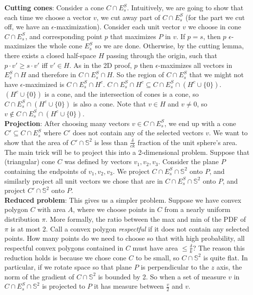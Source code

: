 \documentclass[12pt]{article}
\theoremstyle{definition}
\theoremstyle{lemma}
\theoremstyle{theorem}
\begin{document}
\textbf{Cutting cones}: Consider a cone $C \cap E^S_s$. Intuitively, we are going to show that each time we choose a vector $v$, we cut away part of $C \cap E^S_s$ (for the part we cut off, we have an $\epsilon$-maximization). Consider each unit vector $v$ we choose in cone $C \cap E^S_s$, and corresponding point $p$ that maximizes $P$ in $v$. If $p = s$, then $p$ $\epsilon$-maximizes the whole cone $E^S_s$ so we are done. Otherwise, by the cutting lemma, there exists a closed half-space $H$ passing through the origin, such that $p \cdot v' \geq s \cdot v'$ iff $v' \in H$. As in the 2D proof, $p$ then $\epsilon$-maximizes all vectors in $E^S_s \cap H$ and therefore in $C \cap E^S_s \cap H$. So the region of $C \cap E^S_s$ that we might not have $\epsilon$-maximized is $C \cap E^S_s \cap H^c$. $C \cap E^S_s \cap H^c \subseteq C \cap E^S_s \cap (H^c \cup \{0\})$. $(H^c \cup \{0\})$ is a cone, and the intersection of cones is a cone, so  $C \cap E^S_s \cap (H^c \cup \{0\})$ is also a cone. Note that $v \in H$ and $v \neq 0$, so $v \not\in C \cap E^S_s \cap (H^c \cup \{0\})$.
\\

\textbf{Projection}: After choosing many vectors $v \in C \cap E^S_s$, we end up with a cone $C' \subseteq C \cap E^S_s$ where $C'$ does not contain any of the selected vectors $v$. We want to show that the area of $C' \cap \mathbb {S}^2$ is less than $\frac{\delta}{ck}$ fraction of the unit sphere's area. The main trick will be to project this into a 2-dimensional problem. Suppose that (triangular) cone $C$ was defined by vectors $v_1, v_2, v_3$. Consider the plane $P$ containing the endpoints of $v_1, v_2, v_3$. We project $C \cap E^S_s \cap \mathbb {S}^2$ onto $P$, and similarly project all unit vectors we chose that are in $C \cap E^S_s \cap \mathbb {S}^2$ onto $P$, and project $C' \cap \mathbb {S}^2$ onto $P$. 
\\

\textbf{Reduced problem}: This gives us a simpler problem. Suppose we have convex polygon $C$ with area $A$, where we choose points in $C$ from a nearly uniform distribution $\pi$. More formally, the ratio between the max and min of the PDF of $\pi$ is at most 2. Call a convex polygon \emph{respectful} if it does not contain any selected points. How many points do we need to choose so that with high probability, all respectful convex polygons contained in $C$ must have area $\leq \frac{\delta}{k}$? The reason this reduction holds is because we chose cone $C$ to be small, so $C \cap \mathbb {S}^2$ is quite flat. In particular, if we rotate space so that plane $P$ is perpendicular to the $z$ axis, the norm of the gradient of $C \cap \mathbb {S}^2$ is bounded by 2. So when a set of measure $v$ in $C \cap E^S_s \cap \mathbb {S}^2$ is projected to $P$ it has measure between $\frac{v}{2}$ and $v$.
\end{document}
